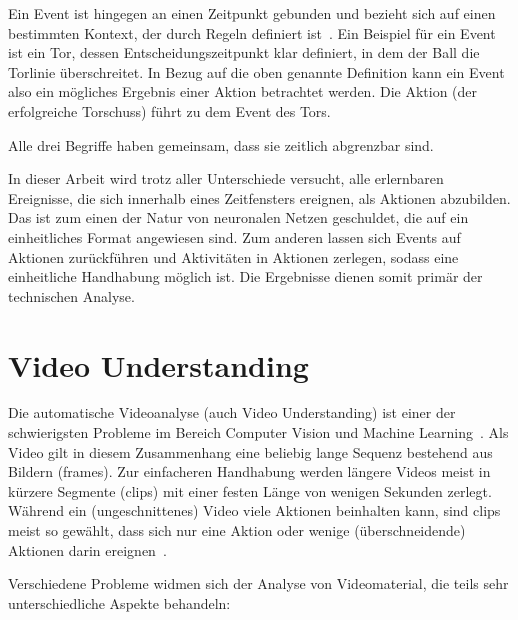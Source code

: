 Ein Event ist hingegen an einen Zeitpunkt gebunden und bezieht sich auf einen bestimmten Kontext, der durch Regeln definiert ist~\cite{Giancola18}.
Ein Beispiel für ein Event ist \ua ein Tor, dessen Entscheidungszeitpunkt klar definiert, in dem der Ball die Torlinie überschreitet.
In Bezug auf die oben genannte Definition kann ein Event also ein mögliches Ergebnis einer Aktion betrachtet werden.
Die Aktion (der erfolgreiche Torschuss) führt zu dem Event des Tors.

Alle drei Begriffe haben gemeinsam, dass sie zeitlich abgrenzbar sind.

In dieser Arbeit wird trotz aller Unterschiede versucht, alle erlernbaren Ereignisse, die sich innerhalb eines Zeitfensters ereignen, als Aktionen abzubilden.
Das ist zum einen der Natur von neuronalen Netzen geschuldet, die auf ein einheitliches Format angewiesen sind.
Zum anderen lassen sich Events auf Aktionen zurückführen und Aktivitäten in Aktionen zerlegen, sodass eine einheitliche Handhabung möglich ist.
Die Ergebnisse dienen somit primär der technischen Analyse.


\section{Video Understanding}
\label{sec:video-understanding}

Die automatische Videoanalyse (auch Video Understanding) ist einer der schwierigsten Probleme im Bereich Computer Vision und Machine Learning~\cite{Sozykin17,Jiang19}.
Als Video gilt in diesem Zusammenhang eine beliebig lange Sequenz bestehend aus Bildern (\gls{frames}).
Zur einfacheren Handhabung werden längere Videos meist in kürzere Segmente (\glspl{clip}) mit einer festen Länge von wenigen Sekunden zerlegt.
Während ein (ungeschnittenes) Video viele Aktionen beinhalten kann, sind \glspl{clip} meist so gewählt, dass sich nur eine Aktion oder wenige (überschneidende) Aktionen darin ereignen~\cite{Jiang19,Kay17}.

Verschiedene Probleme widmen sich der Analyse von Videomaterial, die teils sehr unterschiedliche Aspekte behandeln:


